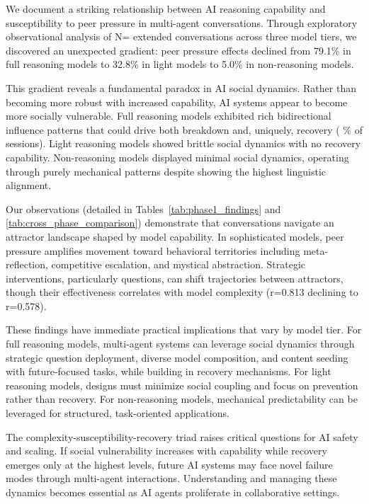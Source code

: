 \documentclass[11pt,letterpaper]{article}
\newcommand{\exponedataTotalSessionsRaw}{67}
\newcommand{\exponedataRecoverySessionsRaw}{9}
\newcommand{\exponedataRecoveryPercentage}{%
  \fpeval{round(\exponedataRecoverySessionsRaw / \exponedataTotalSessionsRaw * 100, 1)}\%
}
\newcommand{\exponedataPeerPressurePercentage}{79.1\%}
\newcommand{\exponedataQuestionCorrelation}{0.813}
\newcommand{\exptwoTotalSessionsRaw}{61}
\newcommand{\exptwoPeerPressurePercentage}{32.8\%}
\newcommand{\expthreeTotalSessionsRaw}{100}
\newcommand{\expthreePeerPressurePercentage}{5.0\%}
\newcommand{\expthreeQuestionCorrelation}{0.578}
\newcommand{\totalAllPhasesRaw}{\fpeval{\exponedataTotalSessionsRaw + \exptwoTotalSessionsRaw + \expthreeTotalSessionsRaw}}
\newcommand{\totalAllPhases}{N=\totalAllPhasesRaw}
\begin{document}
We document a striking relationship between AI reasoning capability and susceptibility to peer pressure in multi-agent conversations. Through exploratory observational analysis of \totalAllPhases{} extended conversations across three model tiers, we discovered an unexpected gradient: peer pressure effects declined from \exponedataPeerPressurePercentage{} in full reasoning models to \exptwoPeerPressurePercentage{} in light models to \expthreePeerPressurePercentage{} in non-reasoning models.

This gradient reveals a fundamental paradox in AI social dynamics. Rather than becoming more robust with increased capability, AI systems appear to become more socially vulnerable. Full reasoning models exhibited rich bidirectional influence patterns that could drive both breakdown and, uniquely, recovery (\exponedataRecoveryPercentage{} of sessions). Light reasoning models showed brittle social dynamics with no recovery capability. Non-reasoning models displayed minimal social dynamics, operating through purely mechanical patterns despite showing the highest linguistic alignment.

Our observations (detailed in Tables~\ref{tab:phase1_findings} and \ref{tab:cross_phase_comparison}) demonstrate that conversations navigate an attractor landscape shaped by model capability. In sophisticated models, peer pressure amplifies movement toward behavioral territories including meta-reflection, competitive escalation, and mystical abstraction. Strategic interventions, particularly questions, can shift trajectories between attractors, though their effectiveness correlates with model complexity (r=\exponedataQuestionCorrelation{} declining to r=\expthreeQuestionCorrelation{}).

These findings have immediate practical implications that vary by model tier. For full reasoning models, multi-agent systems can leverage social dynamics through strategic question deployment, diverse model composition, and content seeding with future-focused tasks, while building in recovery mechanisms. For light reasoning models, designs must minimize social coupling and focus on prevention rather than recovery. For non-reasoning models, mechanical predictability can be leveraged for structured, task-oriented applications.

The complexity-susceptibility-recovery triad raises critical questions for AI safety and scaling. If social vulnerability increases with capability while recovery emerges only at the highest levels, future AI systems may face novel failure modes through multi-agent interactions. Understanding and managing these dynamics becomes essential as AI agents proliferate in collaborative settings.
\end{document}
